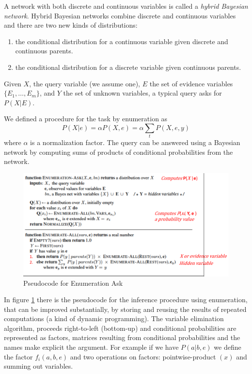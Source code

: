 A network with both discrete and continuous variables is called a
\emph{hybrid Bayesian network}.\newline
Hybrid Bayesian networks combine discrete and continuous variables and there are 
two new kinds of distributions:
\begin{enumerate}
   \item the conditional distribution for a continuous variable given discrete
         and continuous parents.
   \item the conditional distribution for a discrete variable given continuous parents.
\end{enumerate}
Given $X$, the query variable (we assume one), $E$ the set of evidence variables $\{E_1, 
\dots, E_m\}$, and $Y$ the set of unknown variables, a typical query asks for $P(X | E)$.

We defined a procedure for the task by enumeration as 
\[ P(X | e) = \alpha P(X, e) = \alpha \sum_t P(X, e, y) \]
where $\alpha$ is a normalization factor.\newline
The query can be answered using a Bayesian network by computing sums of products of
conditional probabilities from the network.

\begin{figure}
	\includegraphics[width=\textwidth]{Images/enumerationAsk}
	\caption{Pseudocode for Enumeration Ask}
	\label{img:enumerationAsk}
\end{figure}
In figure \ref{img:enumerationAsk} there is the pseudocode for the inference procedure 
using enumeration, that can be improved substantially, by storing and reusing the
results of repeated computations (a kind of dynamic programming).\newline
The variable elimination algorithm, proceeds right-to-left (bottom-up) and 
conditional probabilities are represented as factors, matrices resulting from conditional
probabilities and the names make explicit the argument.\newline
For example if we have $P(a | b, e)$ we define the factor $f_i(a, b, e)$ and 
two operations on factors: pointwise-product $(x)$ and summing out variables.

